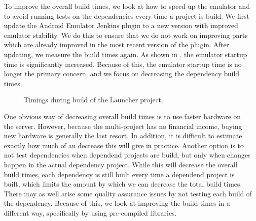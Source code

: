To improve the overall build times, we look at how to speed up the emulator and to avoid running tests on the dependencies every time a project is build. We first update the Android Emulator Jenkins plugin to a new version with improved emulator stability. We do this to ensure that we do not work on improving parts which are already improved in the most recent version of the plugin. After updating, we measure the build times again. As shown in , the emulator startup time is significantly increased. Because of this, the emulator startup time is no longer the primary concern, and we focus on decreasing the dependency build times. 

\begin{figure}
\centering
{}
\caption{Timings during build of the Launcher project.}\label{fig:launcher_build_times_2}
\end{figure}

One obvious way of decreasing overall build times is to use faster hardware on the server. However, because the multi-project has no financial income, buying new hardware is generally the last resort. In addition, it is difficult to estimate exactly how much of an decrease this will give in practice. Another option is to not test dependencies when dependend projects are build, but only when changes happen in the actual dependency project. While this will decrease the overall build times, each dependency is still built every time a dependend project is built, which limits the amount by which we can decrease the total build times. There may as well arise some quality assurance issues by not testing each build of the dependency. Because of this, we look at improving the build times in a different way, specifically by using pre-compiled libraries.

